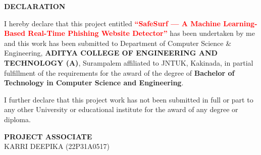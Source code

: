 \begin{center}
{\bfseries\fontsize{16}{18}\selectfont DECLARATION}
\end{center}

\vspace{0.5cm}
\noindent
I hereby declare that this project entitled
\textbf{\textcolor{red}{``SafeSurf — A Machine Learning-Based Real-Time Phishing Website Detector''}}
has been undertaken by me and this work has been submitted to Department of Computer Science \& Engineering,
\textbf{ADITYA \newline COLLEGE OF ENGINEERING AND TECHNOLOGY (A)}, Surampalem affiliated to JNTUK, Kakinada,
in partial fulfillment of the requirements for the award of the degree of
\textbf{Bachelor of Technology in Computer Science and Engineering}.

\vspace{0.5cm}

\noindent
I further declare that this project work has not been submitted in full or part to any other University
or educational institute for the award of any degree or diploma.

\vspace{2cm}

\begin{flushright}
\textbf{PROJECT ASSOCIATE}\\[0.5cm]

KARRI DEEPIKA (22P31A0517)
\end{flushright}